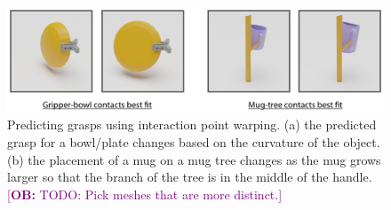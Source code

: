 \documentclass{article}
\newcommand{\ob}[1]{\textcolor{purple}{[\textbf{OB:} #1]}}
\newcommand{\pcx}[1]{\mathrm{pcd}^{(#1)}}
\begin{document}
\begin{figure}
    \centering
    \includegraphics[width=\textwidth]{figures/picks_and_places.pdf}
    \caption{Predicting grasps using interaction point warping. (a) the predicted grasp for a bowl/plate changes based on the curvature of the object. (b) the placement of a mug on a mug tree changes as the mug grows larger so that the branch of the tree is in the middle of the handle. \ob{TODO: Pick meshes that are more distinct.}}
    \label{fig:grasps_and_placements}
\end{figure}


\end{document}
